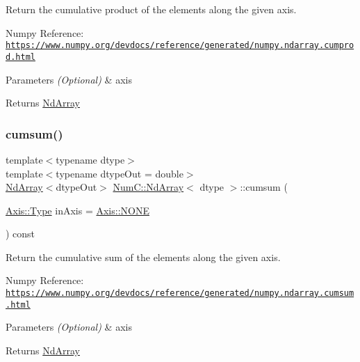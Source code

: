 Return the cumulative product of the elements along the given axis.

Numpy Reference\+: \href{https://www.numpy.org/devdocs/reference/generated/numpy.ndarray.cumprod.html}{\tt https\+://www.\+numpy.\+org/devdocs/reference/generated/numpy.\+ndarray.\+cumprod.\+html}


\begin{DoxyParams}{Parameters}
{\em (\+Optional)} & axis \\
\hline
\end{DoxyParams}
\begin{DoxyReturn}{Returns}
\mbox{\hyperlink{class_num_c_1_1_nd_array}{Nd\+Array}} 
\end{DoxyReturn}
\mbox{\label{class_num_c_1_1_nd_array_a2124ddf2c54e5c2c59763c1010d7592d}} 
\subsubsection{\texorpdfstring{cumsum()}{cumsum()}}
{\footnotesize\ttfamily template$<$typename dtype$>$ \\
template$<$typename dtype\+Out  = double$>$ \\
\mbox{\hyperlink{class_num_c_1_1_nd_array}{Nd\+Array}}$<$dtype\+Out$>$ \mbox{\hyperlink{class_num_c_1_1_nd_array}{Num\+C\+::\+Nd\+Array}}$<$ dtype $>$\+::cumsum (\begin{DoxyParamCaption}\item[{\mbox{\hyperlink{struct_num_c_1_1_axis_a8e689044ef1941a03482e730c5e7ebb3}{Axis\+::\+Type}}}]{in\+Axis = {\ttfamily \mbox{\hyperlink{struct_num_c_1_1_axis_a8e689044ef1941a03482e730c5e7ebb3a0ae033c4226f7184bf0050b101e7ed94}{Axis\+::\+N\+O\+NE}}} }\end{DoxyParamCaption}) const\hspace{0.3cm}{\ttfamily [inline]}}

Return the cumulative sum of the elements along the given axis.

Numpy Reference\+: \href{https://www.numpy.org/devdocs/reference/generated/numpy.ndarray.cumsum.html}{\tt https\+://www.\+numpy.\+org/devdocs/reference/generated/numpy.\+ndarray.\+cumsum.\+html}


\begin{DoxyParams}{Parameters}
{\em (\+Optional)} & axis \\
\hline
\end{DoxyParams}
\begin{DoxyReturn}{Returns}
\mbox{\hyperlink{class_num_c_1_1_nd_array}{Nd\+Array}} 
\end{DoxyReturn}
\mbox{\label{class_num_c_1_1_nd_array_a96b353eeb4cf46de14b1ad1c277f5060}} 
